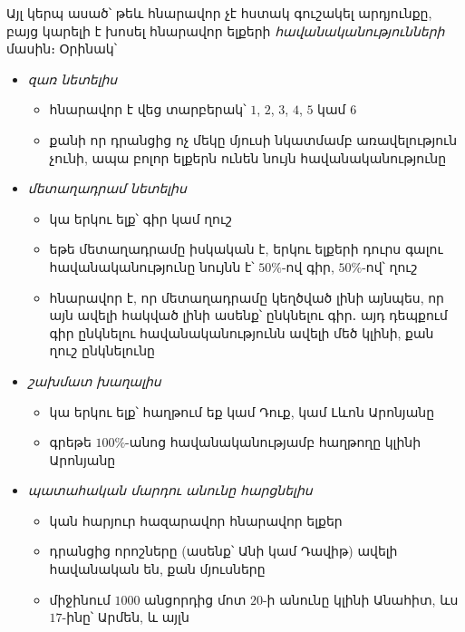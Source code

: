 Այլ կերպ ասած՝ թեև հնարավոր չէ հստակ գուշակել արդյունքը, բայց կարելի է խոսել հնարավոր ելքերի \textit{հավանականությունների} մասին։ Օրինակ՝
\begin{itemize}
    \item \textit{զառ նետելիս}  

    \begin{itemize}
        \item[-] հնարավոր է վեց տարբերակ՝ $1$, $2$, $3$, $4$, $5$ կամ $6$
        
        \item[-] քանի որ դրանցից ոչ մեկը մյուսի նկատմամբ առավելություն չունի, ապա բոլոր ելքերն ունեն նույն հավանականությունը
    \end{itemize}

    \item \textit{մետաղադրամ նետելիս} 

    \begin{itemize}
        \item[-] կա երկու ելք՝ գիր կամ ղուշ
        
        \item[-] եթե մետաղադրամը իսկական է, երկու ելքերի դուրս գալու հավանականությունը նույնն է՝ $50\%$-ով գիր, $50\%$-ով՝ ղուշ

        \item[-] հնարավոր է, որ մետաղադրամը կեղծված լինի այնպես, որ այն ավելի հակված լինի ասենք՝ ընկնելու գիր․ այդ դեպքում գիր ընկնելու հավանականությունն ավելի մեծ կլինի, քան ղուշ ընկնելունը
    \end{itemize}

    \item \textit{շախմատ խաղալիս}

    \begin{itemize}
        \item[-] կա երկու ելք՝ հաղթում եք կամ Դուք, կամ Լևոն Արոնյանը
        \item[-] գրեթե $100\%$-անոց հավանականությամբ հաղթողը կլինի Արոնյանը
    \end{itemize}
    
    \item \textit{պատահական մարդու անունը հարցնելիս}

    \begin{itemize}
        \item[-] կան հարյուր հազարավոր հնարավոր ելքեր
        \item[-] դրանցից որոշները (ասենք՝ Անի կամ Դավիթ) ավելի հավանական են, քան մյուսները
        \item[-] միջինում $1000$ անցորդից մոտ $20$-ի անունը կլինի Անահիտ, ևս $17$-ինը՝ Արմեն, և այլն
    \end{itemize}
        

\end{itemize}
